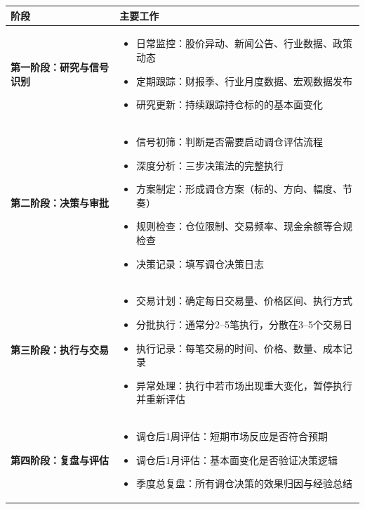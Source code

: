 \begin{exhibitbox}[表9-27：调仓执行四阶段流程]
\scriptsize
\setlength{\tabcolsep}{3pt}
\renewcommand{\arraystretch}{1.12}
\begin{tabularx}{\textwidth}{l X}
\toprule
\textbf{阶段} & \textbf{主要工作} \\
\midrule
\textbf{第一阶段：研究与信号识别} & 
\begin{itemize}[leftmargin=1.2em]
\item 日常监控：股价异动、新闻公告、行业数据、政策动态
\item 定期跟踪：财报季、行业月度数据、宏观数据发布
\item 研究更新：持续跟踪持仓标的的基本面变化
\end{itemize}
\\
\midrule
\textbf{第二阶段：决策与审批} & 
\begin{itemize}[leftmargin=1.2em]
\item 信号初筛：判断是否需要启动调仓评估流程
\item 深度分析：三步决策法的完整执行
\item 方案制定：形成调仓方案（标的、方向、幅度、节奏）
\item 规则检查：仓位限制、交易频率、现金余额等合规检查
\item 决策记录：填写调仓决策日志
\end{itemize}
\\
\midrule
\textbf{第三阶段：执行与交易} & 
\begin{itemize}[leftmargin=1.2em]
\item 交易计划：确定每日交易量、价格区间、执行方式
\item 分批执行：通常分2--5笔执行，分散在3--5个交易日
\item 执行记录：每笔交易的时间、价格、数量、成本记录
\item 异常处理：执行中若市场出现重大变化，暂停执行并重新评估
\end{itemize}
\\
\midrule
\textbf{第四阶段：复盘与评估} & 
\begin{itemize}[leftmargin=1.2em]
\item 调仓后1周评估：短期市场反应是否符合预期
\item 调仓后1月评估：基本面变化是否验证决策逻辑
\item 季度总复盘：所有调仓决策的效果归因与经验总结
\end{itemize}
\\
\bottomrule
\end{tabularx}
\end{exhibitbox}

